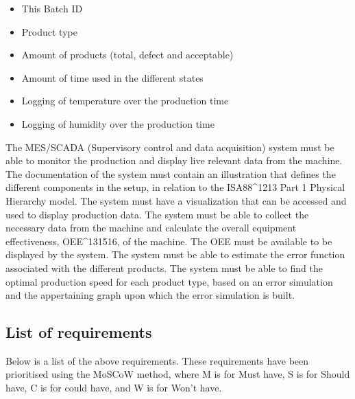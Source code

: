 \begin{itemize}
    \item This Batch ID
    \item Product type
    \item Amount of products (total, defect and acceptable)
    \item Amount of time used in the different states
    \item Logging of temperature over the production time
    \item Logging of humidity over the production time
\end{itemize}

The MES/SCADA (Supervisory control and data acquisition) system must be able to monitor the production and display live relevant data from the machine.
The documentation of the system must contain an illustration that defines the different components in the setup, in relation to the ISA88\^{}1213 Part 1 Physical Hierarchy model.
The system must have a visualization that can be accessed and used to display production data.
The system must be able to collect the necessary data from the machine and calculate the overall equipment effectiveness, OEE\^{}131516, of the machine. The OEE must be available to be displayed by the system.
The system must be able to estimate the error function associated with the different products.
The system must be able to find the optimal production speed for each product type, based on an error simulation and the appertaining graph upon which the error simulation is built.

\subsection{List of requirements}
Below is a list of the above requirements. These requirements have been
prioritised using the MoSCoW method, where M is for Must have, S is for
Should have, C is for could have, and W is for Won't have. 

